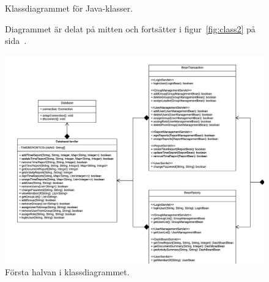 \documentclass[paper=a4, fontsize=11pt,twoside]{article}
\begin{document}
\begin{center} 
\begin{figure}[h!]
\centering
\centerline{Klassdiagrammet för Java-klasser.}
\centerline{Diagrammet är delat på mitten och fortsätter i figur~\ref{fig:class2} på sida~\pageref{fig:class2}.}
\includegraphics[width=15cm]{Klassdiagram1}
\caption{Första halvan i klassdiagrammet.\label{fig:class1}}
\end{figure}
\end{center} 
\end{document}
